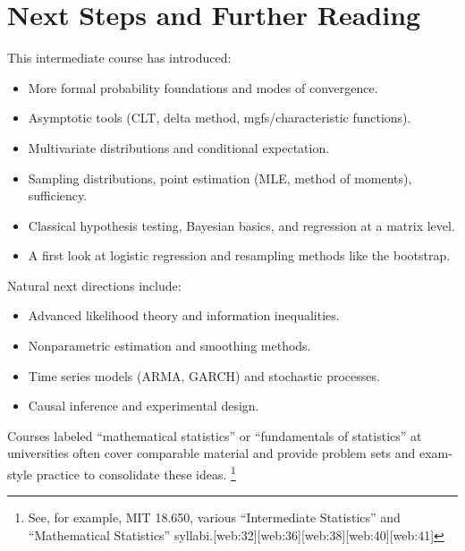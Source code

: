 \documentclass[11pt,a4paper]{article}
\begin{document}
\newpage

\section{Next Steps and Further Reading}

This intermediate course has introduced:
\begin{itemize}
    \item More formal probability foundations and modes of convergence.
    \item Asymptotic tools (CLT, delta method, mgfs/characteristic functions).
    \item Multivariate distributions and conditional expectation.
    \item Sampling distributions, point estimation (MLE, method of moments), sufficiency.
    \item Classical hypothesis testing, Bayesian basics, and regression at a matrix level.
    \item A first look at logistic regression and resampling methods like the bootstrap.
\end{itemize}

Natural next directions include:
\begin{itemize}
    \item Advanced likelihood theory and information inequalities.
    \item Nonparametric estimation and smoothing methods.
    \item Time series models (ARMA, GARCH) and stochastic processes.
    \item Causal inference and experimental design.
\end{itemize}

Courses labeled ``mathematical statistics'' or ``fundamentals of statistics'' at universities often cover comparable material and provide problem sets and exam-style practice to consolidate these ideas.%
\footnote{See, for example, MIT 18.650, various ``Intermediate Statistics'' and ``Mathematical Statistics'' syllabi.[web:32][web:36][web:38][web:40][web:41]}
\end{document}
